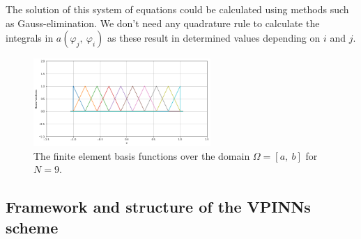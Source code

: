 The solution of this system of equations could be calculated using methods such as Gauss-elimination. We don't need any quadrature rule to calculate the integrals in $a(\varphi_j,\:\varphi_i)$ as these result in determined values depending on $i$ and $j$.

\begin{figure}[h]
    \centering
    \includegraphics[width = 0.6\textwidth]{img/FEMBasisFunctions.png}
    \caption{The finite element basis functions over the domain $\Omega = [a,\:b]$ for $N=9$.}
    \label{fig:fembases}
\end{figure}

\subsection{Framework and structure of the VPINNs scheme}\label{sec:vpinnsframework}

